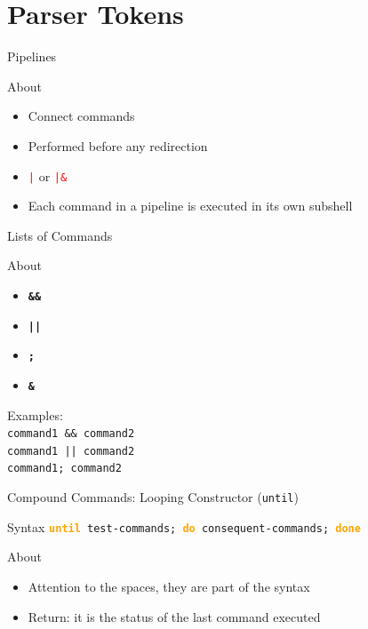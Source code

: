 \documentclass[10pt, compress, aspectratio=169]{beamer}
\begin{document}
\section{Parser Tokens}

\begin{frame}{Pipelines}
  \begin{exampleblock}{About}
    \begin{itemize}
      \item Connect commands
      \item Performed before any redirection
      \item \textcolor{red}{\texttt{|}} or \textcolor{red}{\texttt{|\&}}
      \item Each command in a pipeline is executed in its own subshell
    \end{itemize}
  \end{exampleblock}
\end{frame}

\begin{frame}{Lists of Commands}
  \begin{exampleblock}{About}
    \begin{itemize}
      \item \textbf{\texttt{\&\&}}
      \item \textbf{\texttt{||}}
      \item \textbf{\texttt{;}}
      \item \textbf{\texttt{\&}}
    \end{itemize}
  \end{exampleblock}
  Examples: \\
  \texttt{command1 \&\& command2} \\
  \texttt{command1 || command2} \\
  \texttt{command1; command2}
\end{frame}

\begin{frame}{Compound Commands: Looping Constructor (\texttt{until})}
  \begin{alertblock}{Syntax}
    \texttt{\textbf{\textcolor{orange}{until}} test-commands;
            \textbf{\textcolor{orange}{do}}
            consequent-commands; \textbf{\textcolor{orange}{done}}}
  \end{alertblock}
  \begin{exampleblock}{About}
    \begin{itemize}
      \item Attention to the spaces, they are part of the syntax
      \item Return: it is the status of the last command executed
    \end{itemize}
  \end{exampleblock}
\end{frame}
\end{document}
